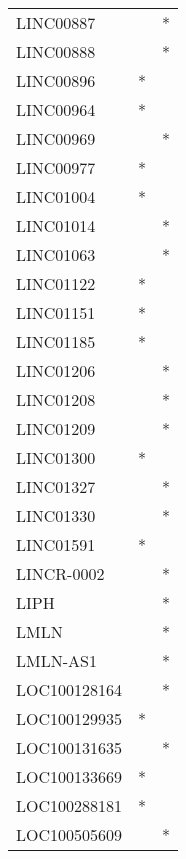 \begin{longtable}{lcc}
LINC00887        &                &          * \\
LINC00888        &                &          * \\
LINC00896        &              * &            \\
LINC00964        &              * &            \\
LINC00969        &                &          * \\
LINC00977        &              * &            \\
LINC01004        &              * &            \\
LINC01014        &                &          * \\
LINC01063        &                &          * \\
LINC01122        &              * &            \\
LINC01151        &              * &            \\
LINC01185        &              * &            \\
LINC01206        &                &          * \\
LINC01208        &                &          * \\
LINC01209        &                &          * \\
LINC01300        &              * &            \\
LINC01327        &                &          * \\
LINC01330        &                &          * \\
LINC01591        &              * &            \\
LINCR-0002       &                &          * \\
LIPH             &                &          * \\
LMLN             &                &          * \\
LMLN-AS1         &                &          * \\
LOC100128164     &                &          * \\
LOC100129935     &              * &            \\
LOC100131635     &                &          * \\
LOC100133669     &              * &            \\
LOC100288181     &              * &            \\
LOC100505609     &                &          * \\

\end{longtable}
